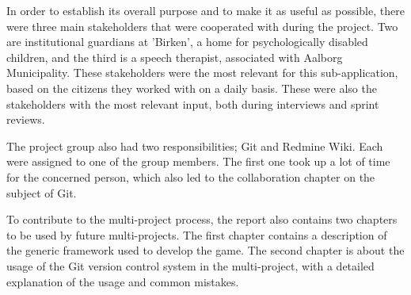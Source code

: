 \documentclass[a4paper,12pt,english]{article}
\begin{document}
In order to establish its overall purpose and to make it as useful as possible, there were three main stakeholders that were cooperated with during the project.
Two are institutional guardians at 'Birken', a home for psychologically disabled children, and the third is a speech therapist, associated with Aalborg Municipality.
These stakeholders were the most relevant for this sub-application, based on the citizens they worked with on a daily basis.
These were also the stakeholders with the most relevant input, both during interviews and sprint reviews.

The project group also had two responsibilities; Git and Redmine Wiki.
Each were assigned to one of the group members.
The first one took up a lot of time for the concerned person, which also led to the collaboration chapter on the subject of Git.

To contribute to the multi-project process, the report also contains two chapters to be used by future multi-projects. The first chapter contains a description of the generic framework used to develop the game.
The second chapter is about the usage of the Git version control system in the multi-project, with a detailed explanation of the usage and common mistakes.
\end{document}
